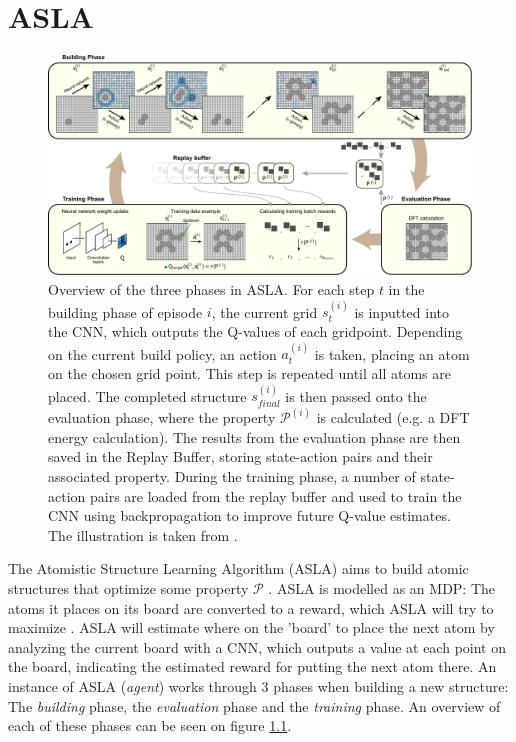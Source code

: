 \chapter{ASLA}

\begin{figure}
	\centering
	\centerline{
		\includegraphics[width=1.3\columnwidth]{graphics/ASLA_overview.pdf}
	}
	\captionsetup{width=1.3\columnwidth}
	\caption{Overview of the three phases in ASLA. For each step $t$ in the building phase of episode $i$, the current grid $s_t^{(i)}$ is inputted into the CNN, which outputs the Q-values of each gridpoint. Depending on the current build policy, an action $a_t^{(i)}$ is taken, placing an atom on the chosen grid point. This step is repeated until all atoms are placed. The completed structure $s_{final}^{(i)}$ is then passed onto the evaluation phase, where the property $\mathcal{P}^{(i)}$ is calculated (e.g. a DFT energy calculation). The results from the evaluation phase are then saved in the Replay Buffer, storing state-action pairs and their associated property. During the training phase, a number of state-action pairs are loaded from the replay buffer and used to train the CNN using backpropagation to improve future Q-value estimates. The illustration is taken from \cite{Hammer}.}
	\label{fig:ASLA_overview}
\end{figure}

The Atomistic Structure Learning Algorithm (ASLA) aims to build atomic structures that optimize some property $\mathcal{P}$ \cite{Hammer}. ASLA is modelled as an MDP: The atoms it places on its board are converted to a reward, which ASLA will try to maximize \cite{henrik_DLA}. ASLA will estimate where on the 'board' to place the next atom by analyzing the current board with a CNN, which outputs a value at each point on the board, indicating the estimated reward for putting the next atom there. An instance of ASLA (\textit{agent}) works through 3 phases when building a new structure: The \textit{building} phase, the \textit{evaluation} phase and the \textit{training} phase. An overview of each of these phases can be seen on figure \ref{fig:ASLA_overview}.\\

